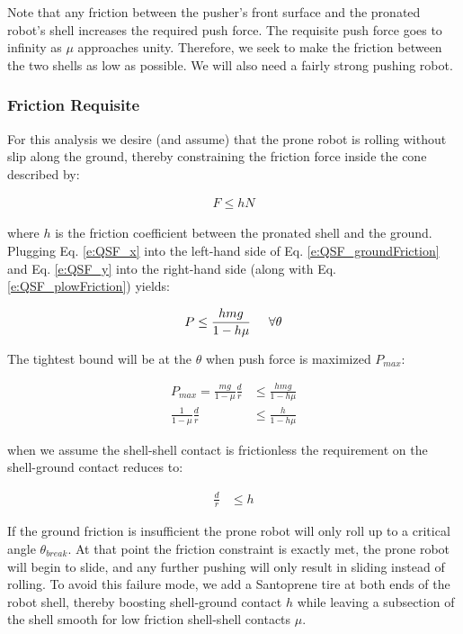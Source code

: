\documentclass[letterpaper, 10 pt, conference]{ieeeconf}
\begin{document}
Note that any friction between the pusher's front surface and the pronated robot's shell increases the required push force.
The requisite push force goes to infinity as $\mu$ approaches unity.
Therefore, we seek to make the friction between the two shells as low as possible.
We will also need a fairly strong pushing robot.

\subsubsection{Friction Requisite}
For this analysis we desire (and assume) that the prone robot is rolling without slip along the ground, thereby constraining the friction force inside the cone described by:

\begin{align}
  F \leq h N \label{e:QSF_groundFriction}
\end{align}

where $h$ is the friction coefficient between the pronated shell and the ground.
Plugging Eq. \ref{e:QSF_x} into the left-hand side of Eq. \ref{e:QSF_groundFriction} and Eq. \ref{e:QSF_y} into the right-hand side (along with Eq. \ref{e:QSF_plowFriction}) yields:

\begin{align}
  P \leq \frac{hmg}{1-h\mu} \label{e:QSF_pushConstraint1} \hspace{5mm} \forall \theta
\end{align}

The tightest bound will be at the $\theta$ when push force is maximized $P_{max}$:

\begin{align}
  P_{max} = \frac{mg}{1-\mu} \frac{d}{r} &\leq \frac{hmg}{1-h\mu} \\
  \frac{1}{1-\mu} \frac{d}{r} &\leq \frac{h}{1-h\mu}
  \label{e:gndFrictionReq}
\end{align}

when we assume the shell-shell contact is frictionless the requirement on the shell-ground contact reduces to:

\begin{align}
  \frac{d}{r} &\leq h
\end{align}

If the ground friction is insufficient the prone robot will only roll up to a critical angle $\theta_{break}$.
At that point the friction constraint is exactly met, the prone robot will begin to slide, and any further pushing will only result in sliding instead of rolling.
To avoid this failure mode, we add a Santoprene tire at both ends of the robot shell, thereby boosting shell-ground contact $h$ while leaving a subsection of the shell smooth for low friction shell-shell contacts $\mu$.
\end{document}
